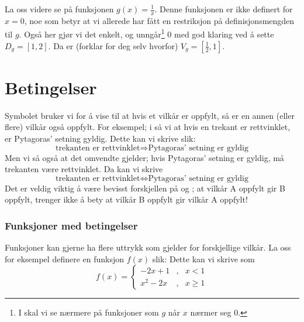 La oss videre se på funksjonen $ g(x)=\frac{1}{x} $. Denne funksjonen er ikke definert for $ x=0 $, noe som betyr at vi allerede har fått en restriksjon på definisjonsmengden til $ g $. Også her gjør vi det enkelt, og unngår\footnote{I  skal vi se nærmere på funksjoner som $ g $ når $ x $ nærmer seg 0.} 0 med god klaring ved å sette $ D_g=[1, 2] $. Da er (forklar for deg selv hvorfor) $ V_g=\left[\frac{1}{2}, 1\right] $.\regv
 
\section{Betingelser}
Symbolet \sym{$ \Rightarrow $} bruker vi for å vise til at hvis et vilkår er oppfylt, så er en annen (eller flere) vilkår også oppfylt. For eksempel; i \mb\;så vi at hvis en trekant er rettvinklet, er Pytagoras' setning gyldig. Dette kan vi skrive slik:
\[ \text{trekanten er rettvinklet} \Rightarrow \text{Pytagoras' setning er gyldig}\]
Men vi så også at det omvendte gjelder; hvis Pytagoras' setning er gyldig, må trekanten være rettvinklet. Da kan vi skrive
\[ \text{trekanten er rettvinklet} \iff \text{Pytagoras' setning er gyldig}\]
Det er veldig viktig å være bevisst forskjellen på \sym{$ \Rightarrow $} og \sym{$ \iff $}; at vilkår A oppfylt gir B oppfylt, trenger ikke å bety at vilkår B oppfylt gir vilkår A oppfylt! \regv

\subsubsection{Funksjoner med betingelser}
Funksjoner kan gjerne ha flere uttrykk som gjelder for forskjellige vilkår. La oss for eksempel definere en funksjon $ f(x) $ slik:
Dette kan vi skrive som
\begin{equation}f(x)= \left\lbrace{
		\begin{array}{rcr}
			-2x+1 &,&x<1 \\
			x^2-2x   &,& x\geq 1
		\end{array}
	}\right. 
\end{equation}

